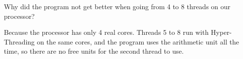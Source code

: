 \begin{tamrin}
    Why did the program  not get better when going from 4 to 8 threads on our processor?
\end{tamrin}
\begin{hall}
    Because the processor has only 4 real cores. Threads 5 to 8 run with Hyper-Threading on the same cores, and the program
    uses the arithmetic unit all the time, so there are no free units for the second thread to use.
\end{hall}

